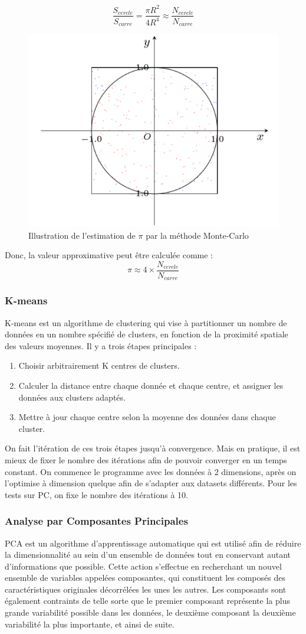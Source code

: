 \documentclass[12pt,a4paper]{article}
\begin{document}
$$ \dfrac{S_{cercle}}{S_{carre}} = \dfrac{\pi R^2}{4R^4} \approx \dfrac{N_{cercle}}{N_{carre}}$$
\begin{figure}[H]
	\centering
	\includegraphics[width=0.5\linewidth]{soft/screenshot002}
	\caption{Illustration de l'estimation de $\pi$ par la méthode Monte-Carlo}
	\label{fig:screenshot002}
\end{figure}
Donc, la valeur approximative peut être calculée comme :
$$ \pi \approx 4 \times \dfrac{N_{cercle}}{N_{carre}}$$

\subsubsection{K-means}
K-means est un algorithme de clustering qui vise à partitionner un nombre de données en un nombre spécifié de clusters, en fonction de la proximité spatiale des valeurs moyennes. Il y a trois étapes principales :
\begin{enumerate}
\item Choisir arbitrairement K centres de clusters.
\item Calculer la distance entre chaque donnée et chaque centre, et assigner les données aux clusters adaptés.
\item Mettre à jour chaque centre selon la moyenne des données dans chaque cluster.
\end{enumerate}
On fait l’itération de ces trois étapes jusqu’à convergence. Mais en pratique, il est mieux de fixer le nombre des itérations afin de pouvoir converger en un temps constant. On commence le programme avec les données à 2 dimensions, après on l’optimise à dimension quelque afin de s’adapter aux datasets différents. Pour les tests sur PC, on fixe le nombre des itérations à 10.

\subsubsection{Analyse par Composantes Principales}
PCA est un algorithme d'apprentissage automatique qui est utilisé afin de réduire la dimensionnalité au sein d'un ensemble de données tout en conservant autant d'informations que possible. Cette action s'effectue en recherchant un nouvel ensemble de variables appelées composantes, qui constituent les composés des caractéristiques originales décorrélées les unes les autres. Les composants sont également contraints de telle sorte que le premier composant représente la plus grande variabilité possible dans les données, le deuxième composant la deuxième variabilité la plus importante, et ainsi de suite.
\end{document}

